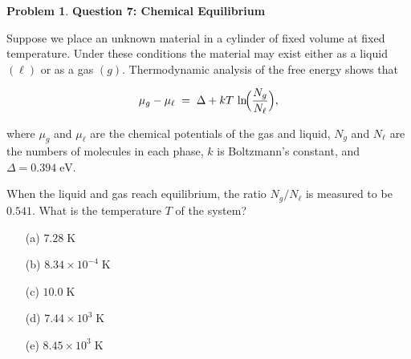 \documentclass[10pt]{article}
\theoremstyle{definition} %
\newtheorem{problem}{Problem}
\theoremstyle{plain} %
\begin{document}
                                \begin{problem}
                                  \textbf{Question 7: Chemical Equilibrium}
                                  
                                  Suppose we place an unknown material in a cylinder of fixed volume at fixed
                                  temperature.  Under these conditions the material may exist either as a
                                  liquid \((\ell)\) or as a gas \((g)\).
                                  Thermodynamic analysis of the free energy shows that
                                  
                                  \[
                                     \mu_{g}-\mu_{\ell} \;=\; \Delta + kT\,
                                     \ln\!\Bigl(\frac{N_{g}}{N_{\ell}}\Bigr),
                                  \]
                                  
                                  where \(\mu_{g}\) and \(\mu_{\ell}\) are the chemical potentials of the gas
                                  and liquid, \(N_{g}\) and \(N_{\ell}\) are the numbers of molecules in each
                                  phase, \(k\) is Boltzmann’s constant, and \(\Delta=0.394\;\text{eV}\).
                                  
                                  \medskip
                                  When the liquid and gas reach equilibrium, the ratio
                                  \(N_{g}/N_{\ell}\) is measured to be \(0.541\).
                                  What is the temperature \(T\) of the system?
                                  
                                  \begin{enumerate}
                                    \item[(a)] \(7.28\;\text{K}\)
                                    \item[(b)] \(8.34\times10^{-4}\;\text{K}\)
                                    \item[(c)] \(10.0\;\text{K}\)
                                    \item[(d)] \(7.44\times10^{3}\;\text{K}\)  %
                                    \item[(e)] \(8.45\times10^{3}\;\text{K}\)
                                  \end{enumerate}
                                  \end{problem}
\end{document}
